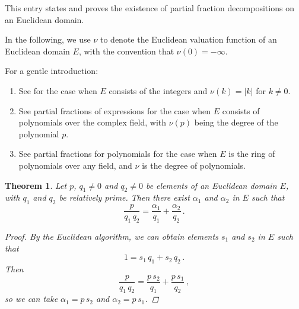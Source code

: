 \documentclass[12pt]{article}
\providecommand{\abs}[1]{\lvert#1\rvert}
\newtheorem{thm}{Theorem}
\begin{document}
This entry states and proves the existence of partial fraction decompositions
on an Euclidean domain.

In the following, we use $\nu$ to denote the Euclidean valuation function
of an Euclidean domain $E$, with the convention that $\nu(0) = -\infty$.

For a gentle introduction:
\begin{enumerate}
\item
See  for the case when $E$ consists of the
integers and $\nu(k) = \abs{k}$
for $k \neq 0$.
\item
See partial fractions of expressions for the case when $E$ 
consists of polynomials over the complex field,
with $\nu(p)$ being the degree of the polynomial $p$.
\item
See partial fractions for polynomials for the case when $E$ is
the ring of polynomials over any field, and $\nu$ is the degree
of polynomials.
\end{enumerate}

\begin{thm}
\label{thm:rel-prime}
Let $p$, $q_1 \neq 0$ and $q_2 \neq 0$ be elements of an Euclidean domain $E$,
with $q_1$ and $q_2$ be relatively prime.
Then there exist $\alpha_1$ and $\alpha_2$ in $E$
such
that
\[
\frac{p}{q_1 \, q_2} = \frac{\alpha_1}{q_1} + \frac{\alpha_2}{q_2}\,.
\]
\begin{proof}
By the Euclidean algorithm, we can obtain elements $s_1$ and $s_2$ in $E$
such that
\[
1 = s_1 \, q_1 + s_2 \, q_2\,.
\]
Then
\[
\frac{p}{q_1 \, q_2} = \frac{p \, s_2 }{q_1} + \frac{p \, s_1 }{q_2}\,,
\]
so we can take $\alpha_1 = p \, s_2$ and $\alpha_2 = p \, s_1$.
\end{proof}
\end{thm}
\end{document}
